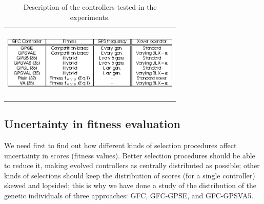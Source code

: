 \documentclass[10pt,journal,compsoc]{IEEEtran}
\begin{document}

\begin{table}[!htp]
	\centering
	{\scriptsize
		\caption{{\scriptsize Description of the controllers tested in the experiments.}}
		{
			\begin{tabular}{c}
			\includegraphics[width=8.5cm, height=3.5cm, clip=true, trim=0cm 0cm 0cm 0cm]{fig/table2.eps} 
%
%
%
%
%
			\end{tabular}
		}\label{tab:drivers}
	}
\end{table}
%


\subsection{Uncertainty in fitness evaluation}

We need first to find out how different  kinds of selection procedures
affect uncertainty in scores (fitness values). Better selection procedures should be able to reduce it, making evolved controllers as centrally distributed
as possible; other kinds of selections should keep  the distribution of
scores (for a single controller) skewed and lopsided; this is why we
have done a study of the distribution of the genetic individuals of
three approaches: {\sf GFC}, {\sf GFC-GPSE}, and {\sf GFC-GPSVA5}. 
\end{document}
